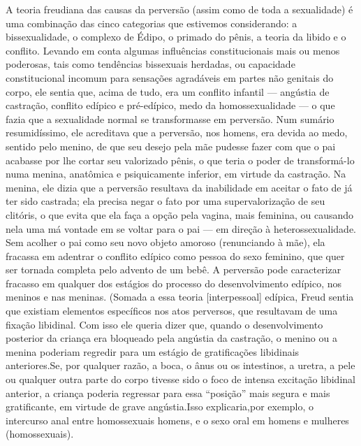  A teoria freudiana das causas da perversão (assim como de toda a
sexualidade) é uma combinação das cinco categorias que estivemos
considerando: a bissexualidade, o complexo de Édipo,\idxconfe{} o primado do
pênis, a teoria da libido e o conflito. Levando em conta algumas
influências constitucionais mais ou menos poderosas, tais como
tendências bissexuais herdadas,\idxbissetend{} ou capacidade constitucional incomum
para sensações agradáveis em partes não genitais do corpo, ele sentia
que, acima de tudo, era um conflito infantil\idxconfemeni{} --- angústia de castração,\idxcasta{}
conflito edípico e pré-edípico, medo da homossexualidade --- o que fazia
que a sexualidade normal se transformasse em perversão. Num sumário
resumidíssimo, ele acreditava que a perversão, nos homens, era devida
ao medo, sentido pelo menino, de que seu desejo pela mãe pudesse fazer
com que o pai acabasse por lhe cortar seu valorizado pênis, o que teria
o poder de transformá-lo numa menina,\idxvaginorg{} anatômica e psiquicamente
inferior, em virtude da castração. Na menina, ele dizia que a perversão
resultava da inabilidade em aceitar o fato de já ter sido castrada; ela
precisa negar o fato por uma supervalorização de seu clitóris,\idxclitfemi{} o que
evita que ela faça a opção pela vagina,\idxvagin{} mais feminina, ou causando nela
uma má vontade em se voltar para o pai --- em direção à
heterossexualidade. Sem acolher o pai como seu novo objeto amoroso
(renunciando à mãe), ela fracassa em adentrar o conflito edípico como
pessoa do sexo feminino, que quer ser tornada completa pelo advento de
um bebê. A perversão pode caracterizar fracasso em qualquer dos
estágios do processo do desenvolvimento edípico, nos meninos e nas
meninas. (Somada a essa teoria [interpessoal] edípica, Freud sentia que
existiam elementos específicos nos atos perversos, que resultavam de
uma fixação\idxfeminfixa{} libidinal.\idxclitfixa{} Com isso ele queria dizer que, quando o
desenvolvimento posterior da criança era bloqueado pela angústia da
castração, o menino ou a menina poderiam regredir\idxhomosregr{} para um estágio de
gratificações libidinais anteriores.\idxaberrfixa[|)] Se, por qualquer razão, a boca, o
ânus ou os intestinos, a uretra, a pele ou qualquer outra parte do
corpo tivesse sido o foco de intensa excitação libidinal anterior, a
criança poderia regressar para essa ``posição'' mais segura e mais gratificante,
em virtude de grave angústia.\idxlibidfixa[|)] Isso explicaria,\idxfreudperve[|)] por exemplo, o
intercurso anal entre homossexuais homens, e o sexo oral em homens e
mulheres (homossexuais).

